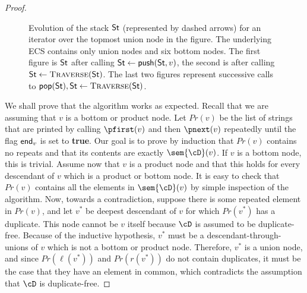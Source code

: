\begin{proof}
\begin{figure}[t]
	\centering
	
	\caption{Evolution of the stack ${\sf St}$ (represented by dashed arrows) for an iterator over the topmost union node in the figure. The underlying ECS contains only union nodes and six bottom nodes. The first figure is ${\sf St}$ after calling ${\sf St} \gets {\sf push}({\sf St}, v)$, the second is after calling ${\sf St} \gets\textsc{Traverse}({\sf St})$. The last two figures represent successive calls to ${\sf pop}({\sf St}), {\sf St} \gets\textsc{Traverse}({\sf St})$.}
	\label{nested:fig-enum-stacks}
\end{figure}

We shall prove that the algorithm works as expected. Recall that we are assuming that $v$ is a bottom or product node. Let $Pr(v)$ be the list of strings that are printed by calling $\pfirst(v)$ and then $\pnext(v)$ repeatedly until the flag $\text{\sf end}_v$ is set to {\bf true}. Our goal is to prove by induction that $Pr(v)$ contains no repeats and that its contents are exactly $\sem{\cD}(v)$. If $v$ is a bottom node, this is trivial. Assume now that $v$ is a product node and that this holds for every descendant of $v$ which is a product or bottom node. It is easy to check that $Pr(v)$ contains all the elements in $\sem{\cD}(v)$ by simple inspection of the algorithm. Now, towards a contradiction, suppose there is some repeated element in $Pr(v)$, and let $v^*$ be deepest descendant of $v$ for which $Pr(v^*)$ has a duplicate. This node cannot be $v$ itself because $\cD$ is assumed to be duplicate-free. Because of the inductive hypothesis, $v^*$ must be a descendant-through-unions of $v$ which is not a bottom or product node. Therefore, $v^*$ is a union node, and since $Pr(\ell(v^*))$ and $Pr(r(v^*))$ do not contain duplicates, it must be the case that they have an element in common, which contradicts the assumption that $\cD$ is duplicate-free.



\end{proof}
